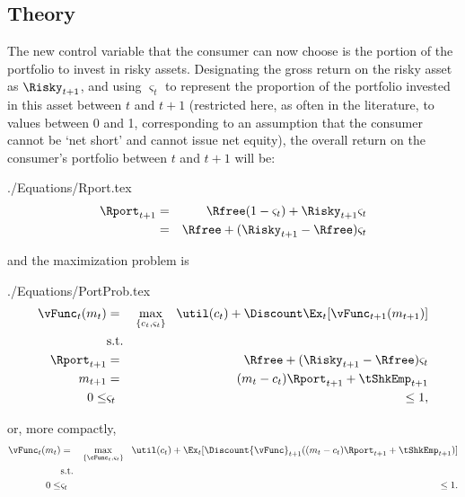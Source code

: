 \documentclass[titlepage]{\econtex}
\begin{document}
\subsection{Theory}
The new control variable that the consumer can now choose
is the portion of the portfolio to invest in risky assets.
Designating the gross return on the risky asset
as $\Risky_{t+1}$, and using $\varsigma_{t}$ to represent the
proportion of the portfolio invested in this asset between $t$ and $t+1$
(restricted here, as often in the literature, to values between 0 and
1, corresponding to an assumption that the consumer cannot be `net
short' and cannot issue net equity), the overall return on
the consumer's portfolio between $t$ and $t+1$ will be:
\begin{verbatimwrite}{./Equations/Rport.tex}
\begin{eqnarray}
        \Rport_{t+1} & = & \Rfree(1-\varsigma_{t}) + \Risky_{t+1}\varsigma_{t} \label{eq:return1}
\\              & = & \Rfree + (\Risky_{t+1}-\Rfree) \varsigma_{t} \label{eq:return2}
\end{eqnarray}
\end{verbatimwrite}

and the maximization problem is
\begin{verbatimwrite}{./Equations/PortProb.tex}
\begin{eqnarray*}
        {\vFunc}_{t}({m}_{t}) & = & \max_{\{{c}_{t},\varsigma_{t}\}}   ~~ \util({c}_{t}) +  \Discount
        \Ex_{t}[{\vFunc}_{t+1}({m}_{t+1})]
\\      & \text{s.t.} & \nonumber
\\      \Rport_{t+1} & = & \Rfree + (\Risky_{t+1}-\Rfree) \varsigma_{t}
\\      {m}_{t+1} & = & ({m}_{t}-{c}_{t})\Rport_{t+1} + \tShkEmp_{t+1}
\\  0       \leq & \varsigma_{t} & \leq 1, \label{eq:noshorts}
\end{eqnarray*}
\end{verbatimwrite}

or, more compactly,
\begin{eqnarray*}
        {\vFunc}_{t}({m}_{t}) & = & \max_{\{\cFunc_{t},\varsigma_{t}\}} ~~  \util({c}_{t}) +  \Ex_{t}[\Discount {\vFunc}_{t+1}(({m}_{t}-{c}_{t}){\Rport}_{t+1} +        {\tShkEmp}_{t+1})]
\\                       & \text{s.t.} & \nonumber
\\ 0 \leq & \varsigma_{t} & \leq 1
.
\end{eqnarray*}
\end{document}
